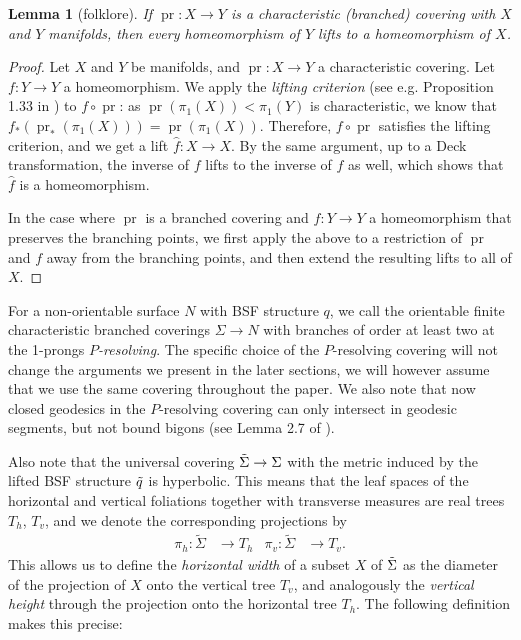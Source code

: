 \documentclass[10pt,a4paper]{amsart}
\newtheorem{lemma}[theorem]{Lemma}
\begin{document}
\begin{lemma}[folklore]\label{lem:char-covers-have-all-lifts}
If $\operatorname{pr}\colon X\rightarrow Y$ is a characteristic (branched) covering with $X$ and $Y$ manifolds, then every homeomorphism of $Y$ lifts to a homeomorphism of $X$.
\end{lemma}

\begin{proof}
Let $X$ and $Y$ be manifolds, and $\operatorname{pr}\colon X\rightarrow Y$ a characteristic covering.
Let $f\colon Y\rightarrow Y$ a homeomorphism.
We apply the \emph{lifting criterion} (see e.g. Proposition 1.33 in \cite{Hatcher}) to $f\circ \operatorname{pr}$:
as $\operatorname{pr}(\pi_1(X)) < \pi_1(Y)$ is characteristic, we know that $f_*(\operatorname{pr}_*(\pi_1(X))) = \operatorname{pr}(\pi_1(X))$.
Therefore, $f\circ \operatorname{pr}$ satisfies the lifting criterion, and we get a lift $\hat{f}\colon X\rightarrow X$.
By the same argument, up to a Deck transformation, the inverse of $f$ lifts to the inverse of $\hat f$ as well, which shows that $\hat{f}$ is a homeomorphism.

In the case where $\operatorname{pr}$ is a branched covering and $f\colon Y\rightarrow Y$ a homeomorphism that preserves the branching points, we first apply the above to a restriction of $\operatorname{pr}$ and $f$ away from the branching points, and then extend the resulting lifts to all of $X$.
\end{proof}

For a non-orientable surface $N$ with BSF structure $q$, we call the orientable finite characteristic branched coverings $\Sigma \rightarrow N$ with branches of order at least two at the 1-prongs \emph{$P$-resolving}.
The specific choice of the $P$-resolving covering will not change the arguments we present in the later sections, we will however assume that we use the same covering throughout the paper.
We also note that now closed geodesics in the $P$-resolving covering can only intersect in geodesic segments, but not bound bigons (see Lemma 2.7 of \cite{BHW2}).

Also note that the universal covering $\Tilde{\Sigma}\rightarrow \Sigma$ with the metric induced by the lifted BSF structure $\Tilde{q}$ is hyperbolic.
This means that the leaf spaces of the horizontal and vertical foliations together with transverse measures are real trees $T_h$, $T_v$, and we denote the corresponding projections by
\begin{align*}
    \pi_h\colon \tilde{\Sigma} &\rightarrow T_h & \pi_v\colon \tilde{\Sigma} &\rightarrow T_v.
\end{align*}
This allows us to define the \emph{horizontal width} of a subset $X$ of $\Tilde{\Sigma}$ as the diameter of the projection of $X$ onto the vertical tree $T_v$, and analogously the \emph{vertical height} through the projection onto the horizontal tree $T_h$.
The following definition makes this precise:
\end{document}
